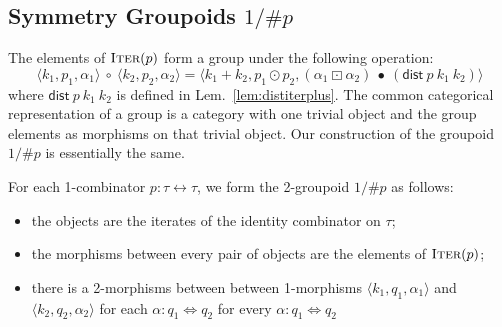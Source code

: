 \documentclass[a4paper,USenglish]{lipics-v2016-utf8x}
\newcommand{\hash}{\#}
\newcommand{\iso}{\leftrightarrow}
\newcommand{\isotwo}{\Leftrightarrow}
\newcommand{\iorder}[1]{1/\hash #1}
\newcommand{\iter}[1]{\textsc{Iter}(#1)}
\newcommand{\triple}[3]{\langle #1,#2,#3 \rangle}
\newcommand{\distiterplus}[3]{\mathsf{dist}~#1~#2~#3}
\newcommand{\permtwo}{\mathit{perm}_{\times\!\times.}}
\newcommand{\idiso}{\mathsf{{id}}}
\newcommand{\idisotwo}{\mathsf{{id}}}
\newcommand{\transtwo}{\bullet}
\newcommand{\respstwo}{\mathsf{{\boxdot}}}
\begin{document}
\begin{center}
\end{center}

\subsection{Symmetry Groupoids $\iorder{p}$}

The elements of $\iter{p}$ form a group under the following operation:
\[
\triple{k_1}{p_1}{\alpha_1} ~\circ~ \triple{k_2}{p_2}{\alpha_2} =
 \triple{k_1+k_2}{p_1 \odot p_2}{(\alpha_1 ~\respstwo~
    \alpha_2)~\transtwo~(\distiterplus{p}{k_1}{k_2})}
\]
where $\distiterplus{p}{k_1}{k_2}$ is defined in
Lem.~\ref{lem:distiterplus}. The common categorical representation of a group is
a category with one trivial object and the group elements as morphisms on that
trivial object. Our construction of the groupoid $\iorder{p}$ is essentially the
same.

\begin{definition}[$\iorder{p}$] For each 1-combinator $p : \tau\iso\tau$, we form the 2-groupoid $\iorder{p}$ as follows:
\begin{itemize}
\item the objects are the iterates of the identity combinator on $\tau$;
\item the morphisms between every pair of objects are the elements of $\iter{p}$;
\item there is a 2-morphisms between between 1-morphisms $\triple{k_1}{q_1}{\alpha_1}$ and $\triple{k_2}{q_2}{\alpha_2}$ for each $\alpha : q_1 \isotwo q_2$ for every $\alpha : q_1 \isotwo q_2$
\end{itemize}
\end{definition}
\end{document}
